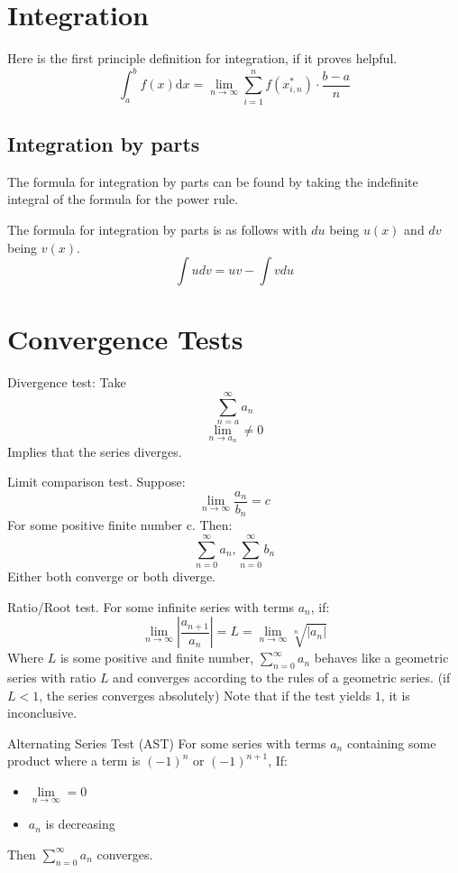 \documentclass[]{article}
\begin{document}
\section{Integration}

\begin{df}
    Here is the first principle definition for integration, if it proves helpful.
    \[\int_a^b f(x) \mathrm{d} x=\lim _{n \rightarrow \infty} \sum_{i=1}^n f\left(x_{i, n}^*\right) \cdot \frac{b-a}{n}\]
\end{df}

\subsection{Integration by parts}
The formula for integration by parts can be found by taking the indefinite integral
of the formula for the power rule. 

\begin{df}
    The formula for integration by parts is as follows with $du$ being $u(x)$ and $dv$ being $v(x)$.
    \[\int u dv = uv - \int v du\]

\end{df}

\section{Convergence Tests}

\begin{df}
    Divergence test:
    Take \[\sum_{n=a}^{\infty}a_n\]
     \[\lim_{n\rightarrow a_n} \neq 0\]
    Implies that the series diverges.
\end{df}
\begin{df}
    Limit comparison test. Suppose:
    \[\lim_{n\rightarrow \infty}\frac{a_n}{b_n}=c\]
    For some positive finite number c.
    Then:
    \[\sum_{n=0}^{\infty}a_n,\sum_{n=0}^{\infty}b_n\]
    Either both converge or both diverge.
\end{df}
\begin{df}
    Ratio/Root test.
    For some infinite series with terms $a_n$, if:
    \[\lim_{n\to\infty} \left| \frac{a_{n+1}}{a_n} \right|=L=
    \lim_{n\to\infty} \sqrt[n]{|a_n|}\]
    Where $L$ is some positive and finite number, $\sum\limits^{\infty}_{n=0}
    a_n$ behaves like a geometric series with ratio $L$ and converges according
    to the rules of a geometric series. (if $L<1$, the series converges absolutely) Note that if the test yields $1$, it
    is inconclusive.
\end{df}
\begin{df}
    Alternating Series Test (AST)
    \newline For some series with terms $a_n$ containing some product where a term
    is $(-1)^n$ or $(-1)^{n+1}$, If:
    \begin{itemize}
        \item $\lim\limits_{n\to\infty} = 0$
        \item $a_n$ is decreasing
    \end{itemize}
    Then $\sum\limits_{n=0}^{\infty}a_n$ converges.
\end{df}
\end{document}
